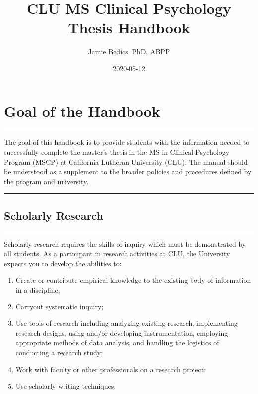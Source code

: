 \documentclass[openany]{book}
\title{CLU MS Clinical Psychology Thesis Handbook}
\author{Jamie Bedics, PhD, ABPP}
\date{2020-05-12}
\providecommand{\tightlist}{%
  \setlength{\itemsep}{0pt}\setlength{\parskip}{0pt}}
\begin{document}
\maketitle

{
\setcounter{tocdepth}{1}
\tableofcontents
}
\hypertarget{goal-of-the-handbook}{%
\chapter{Goal of the Handbook}\label{goal-of-the-handbook}}

\begin{center}\rule{0.5\linewidth}{0.5pt}\end{center}

The goal of this handbook is to provide students with the information needed to successfully complete the master's thesis in the MS in Clinical Psychology Program (MSCP) at California Lutheran University (CLU). The manual should be understood as a supplement to the broader policies and procedures defined by the program and university.

\begin{center}\rule{0.5\linewidth}{0.5pt}\end{center}

\hypertarget{scholarly-research}{%
\section{Scholarly Research}\label{scholarly-research}}

\begin{center}\rule{0.5\linewidth}{0.5pt}\end{center}

Scholarly research requires the skills of inquiry which must be demonstrated by all students. As a participant in research activities at CLU, the University expects you to develop the abilities to:

\begin{enumerate}
\def\labelenumi{\arabic{enumi}.}
\tightlist
\item
  Create or contribute empirical knowledge to the existing body of information in a discipline;
\item
  Carryout systematic inquiry;
\item
  Use tools of research including analyzing existing research, implementing research designs, using and/or developing instrumentation, employing appropriate methods of data analysis, and handling the logistics of conducting a research study;
\item
  Work with faculty or other professionals on a research project;
\item
  Use scholarly writing techniques.
\end{enumerate}
\end{document}
